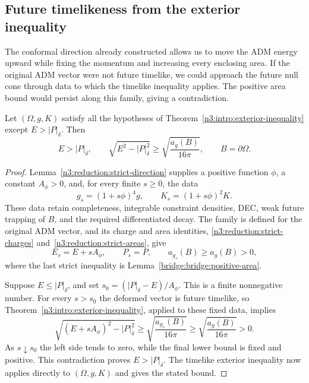 \subsection{Future timelikeness from the exterior inequality}
\label{bridge:bridge:section}

The conformal direction already constructed allows us to move the ADM
energy upward while fixing the momentum and increasing every enclosing
area. If the original ADM vector were not future timelike, we could
approach the future null cone through data to which the timelike
inequality applies. The positive area bound would persist along this
family, giving a contradiction.

\begin{theorem}
\label{bridge:bridge:timelike}\label{thm:weak3}
Let $(\Omega,g,K)$ satisfy all the hypotheses of
Theorem~\ref{n3:intro:exterior-inequality} except $E>|P|_\delta$.
Then
\[
 E>|P|_\delta,\qquad
 \sqrt{E^2-|P|_\delta^2}\ge
                  \sqrt{\frac{a_g(B)}{16\pi}},\qquad B=\partial \Omega.
\]
\end{theorem}

\begin{proof}
Lemma~\ref{n3:reduction:strict-direction} supplies a positive function
$\phi$, a constant $A_\phi>0$, and, for every finite $s\ge0$, the data
\[
       g_s=(1+s\phi)^4g,\qquad K_s=(1+s\phi)^2K.
\]
These data retain completeness, integrable constraint densities, DEC,
weak future trapping of $B$, and the required differentiated decay.
The family is defined for the original ADM vector, and its
charge and area identities, \eqref{n3:reduction:strict-charges}
and~\eqref{n3:reduction:strict-areas}, give
\[
       E_s=E+sA_\phi,\qquad P_s=P,\qquad
       a_{g_s}(B)\ge a_g(B)>0,
\]
where the last strict inequality is
Lemma~\ref{bridge:bridge:positive-area}.

Suppose $E\le|P|_\delta$, and set
$s_0=(|P|_\delta-E)/A_\phi$. This is a finite nonnegative number.
For every $s>s_0$ the deformed vector is future timelike, so
Theorem~\ref{n3:intro:exterior-inequality}, applied to these fixed data,
implies
\[
 \sqrt{(E+sA_\phi)^2-|P|_\delta^2}
       \ge\sqrt{\frac{a_{g_s}(B)}{16\pi}}
       \ge\sqrt{\frac{a_g(B)}{16\pi}}>0.
\]
As $s\downarrow s_0$ the left side tends to zero, while the final
lower bound is fixed and positive. This contradiction proves
$E>|P|_\delta$. The timelike exterior inequality now applies directly
to $(\Omega,g,K)$ and gives the stated bound.
\end{proof}

